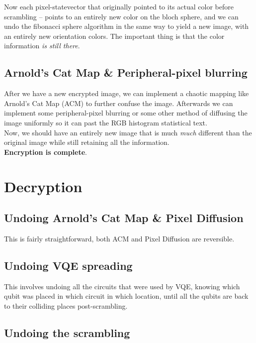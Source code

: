 \documentclass[svgnames]{article}     %
\begin{document}
Now each pixel-statevector that originally pointed to its actual color before
scrambling -- points to an entirely new color on the bloch sphere, and we can
undo the fibonacci sphere algorithm in the same way to yield a new image, with
an entirely new orientation colors. The important thing is that the color
information \textit{is still there}. 

\subsection{Arnold's Cat Map \& Peripheral-pixel blurring} 

After we have a new encrypted image, we can implement a chaotic mapping like
Arnold's Cat Map (ACM) to further confuse the image. Afterwards we can
implement some peripheral-pixel blurring or some other method of diffusing the
image uniformly so it can past the RGB histogram statistical text. \\

Now, we should have an entirely new image that is much \textit{much} different
than the original image while still retaining all the information. \\

\textbf{Encryption is complete}. 


\section{Decryption} 

\subsection{Undoing Arnold's Cat Map \& Pixel Diffusion}

This is fairly straightforward, both ACM and Pixel Diffusion are reversible. 

\subsection{Undoing VQE spreading} 

This involves undoing all the circuits that were used by VQE, knowing which
qubit was placed in which circuit in which location, until all the qubits are
back to their colliding places post-scrambling. 

\subsection{Undoing the scrambling} 
\end{document}

